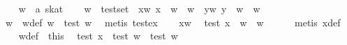 \begin{isabellebody}
\isanewline
\ \ \isamarkupfalse%
\ w\ {}{}\ {}{}a\ skat{}\isanewline
\ \ \isamarkupfalse%
\ {}w\ {}\ test{}set{}\ \ xw{}\ {}x\ {}\ w\ {}\ w{}\ \ yw{}\ {}y\ {}\ w\ {}\ w{}\isanewline
\ \ \isamarkupfalse%
\ \isamarkupfalse%
\ w{}\ \ w{}{}def{}\ {}w\ {}\ test\ w{}{}\ \isamarkupfalse%
\ {}metis\ test{}ex{}\isanewline
\ \ \isamarkupfalse%
\ xw\ \isamarkupfalse%
\ {}{}test\ x{}{}\ {}\ w\ {}\ w{}\isanewline
\ \ \ \ \isamarkupfalse%
\ {}metis\ x{}{}def{}\isanewline
\ \ \isamarkupfalse%
\ w{}{}def\ \ this\ \isamarkupfalse%
\ {}{}test\ x{}{}\ {}\ {}test\ w{}{}\ {}\ {}test\ w{}{}{}\isanewline

\end{isabellebody}
